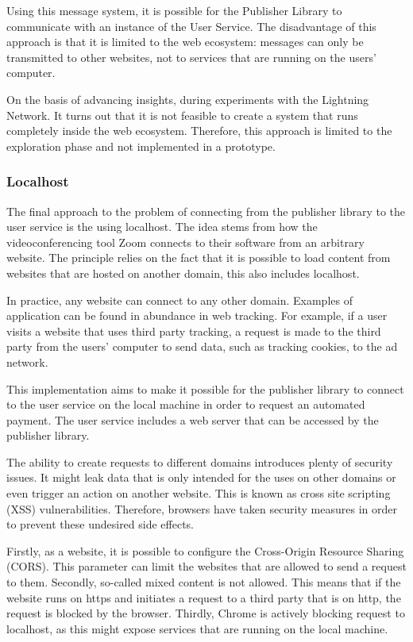 Using this message system, it is possible for the Publisher Library to communicate with an instance of the User Service. The disadvantage of this approach is that it is limited to the web ecosystem: messages can only be transmitted to other websites, not to services that are running on the users' computer. 

On the basis of advancing insights, during experiments with the Lightning Network. It turns out that it is not feasible to create a system that runs completely inside the web ecosystem. Therefore, this approach is limited to the exploration phase and not implemented in a prototype.

\subsubsection{Localhost}
\label{sec:localhost}

The final approach to the problem of connecting from the publisher library to the user service is the using localhost. The idea stems from how the videoconferencing tool Zoom connects to their software from an arbitrary website. The principle relies on the fact that it is possible to load content from websites that are hosted on another domain, this also includes localhost.

In practice, any website can connect to any other domain. Examples of application can be found in abundance in web tracking. For example, if a user visits a website that uses third party tracking, a request is made to the third party from the users' computer to send data, such as tracking cookies, to the ad network. 

This implementation aims to make it possible for the publisher library to connect to the user service on the local machine in order to request an automated payment. The user service includes a web server that can be accessed by the publisher library. 

The ability to create requests to different domains introduces plenty of security issues. It might leak data that is only intended for the uses on other domains or even trigger an action on another website. This is known as cross site scripting (XSS) vulnerabilities. Therefore, browsers have taken security measures in order to prevent these undesired side effects.

Firstly, as a website, it is possible to configure the Cross-Origin Resource Sharing (CORS). This parameter can limit the websites that are allowed to send a request to them. Secondly, so-called mixed content is not allowed. This means that if the website runs on https and initiates a request to a third party that is on http, the request is blocked by the browser. Thirdly, Chrome is actively blocking request to localhost, as this might expose services that are running on the local machine.

